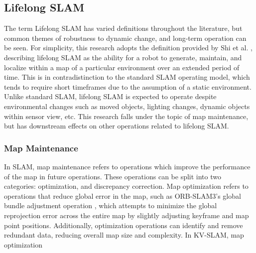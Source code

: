 \subsection{Lifelong SLAM}

The term Lifelong SLAM has varied definitions throughout the literature, but common themes of robustness to dynamic change, and long-term operation can be seen. For simplicity, this research adopts the definition provided by Shi et al. \cite{shiAreWeReady2020}, describing lifelong SLAM as the ability for a robot to generate, maintain, and localize within a map of a particular environment over an extended period of time. This is in contradistinction to the standard SLAM operating model, which tends to require short timeframes due to the assumption of a static environment. Unlike standard SLAM, lifelong SLAM is expected to operate despite environmental changes such as moved objects, lighting changes, dynamic objects within sensor view, etc. This research falls under the topic of map maintenance, but has downstream effects on other operations related to lifelong SLAM.

\subsubsection{Map Maintenance}

In SLAM, map maintenance refers to operations which improve the performance of the map in future operations. These operations can be split into two categories: optimization, and discrepancy correction. Map optimization refers to operations that reduce global error in the map, such as ORB-SLAM3's global bundle adjustment operation \cite{camposORBSLAM3AccurateOpenSource2021}, which attempts to minimize the global reprojection error across the entire map by slightly adjusting keyframe and map point positions. Additionally, optimization operations can identify and remove redundant data, reducing overall map size and complexity. In KV-SLAM, map optimization 